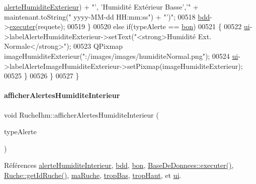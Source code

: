 \begin{DoxyCode}
      \hyperlink{parametres_8h_a83a725fd153179a2bd97afcc8307737bacda66fabe33c8c197f8ff098a952fca3}{alerteHumiditeExterieur}) + \textcolor{stringliteral}{"', 'Humidité Extérieur Basse','"} + maintenant.toString(\textcolor{stringliteral}{"
      yyyy-MM-dd  HH:mm:ss"}) + \textcolor{stringliteral}{"')"};
00518             \hyperlink{class_ruche_ihm_a0851936fe212e8d40538264f09749153}{bdd}->\hyperlink{class_base_de_donnees_aa8de5f8f8bb17edc43f5c0ee33712081}{executer}(requete);
00519          \}
00520          \textcolor{keywordflow}{else} \textcolor{keywordflow}{if}(typeAlerte == \hyperlink{parametres_8h_aaa6de8207c94675264c90b10b613368da5ac8ec3b54d90a07c6bb5a77ef971821}{bon})
00521          \{
00522             \hyperlink{class_ruche_ihm_a64786058bd7f88ca2f1e9743bb27c25b}{ui}->labelAlerteHumiditeExterieur->setText(\textcolor{stringliteral}{"<strong>Humidité Ext. Normale</strong>"});
00523             QPixmap imageHumiditeExterieur(\textcolor{stringliteral}{":/images/images/humiditeNormal.png"});
00524             \hyperlink{class_ruche_ihm_a64786058bd7f88ca2f1e9743bb27c25b}{ui}->labelAlerteImageHumiditeExterieur->setPixmap(imageHumiditeExterieur);
00525          \}
00526     \}
00527 \}
\end{DoxyCode}
\mbox{\label{class_ruche_ihm_abfe91b271dde97048bb218b04c9e167b}} 
\paragraph{\texorpdfstring{afficher\+Alertes\+Humidite\+Interieur}{afficherAlertesHumiditeInterieur}}
{\footnotesize\ttfamily void Ruche\+Ihm\+::afficher\+Alertes\+Humidite\+Interieur (\begin{DoxyParamCaption}\item[{\hyperlink{parametres_8h_aaa6de8207c94675264c90b10b613368d}{Seuils\+Alertes}}]{type\+Alerte }\end{DoxyParamCaption})\hspace{0.3cm}{\ttfamily [slot]}}



Références \hyperlink{parametres_8h_a83a725fd153179a2bd97afcc8307737bac0e80b2d9b7f04033abc44ebcf61883a}{alerte\+Humidite\+Interieur}, \hyperlink{class_ruche_ihm_a0851936fe212e8d40538264f09749153}{bdd}, \hyperlink{parametres_8h_aaa6de8207c94675264c90b10b613368da5ac8ec3b54d90a07c6bb5a77ef971821}{bon}, \hyperlink{class_base_de_donnees_aa8de5f8f8bb17edc43f5c0ee33712081}{Base\+De\+Donnees\+::executer()}, \hyperlink{class_ruche_a9f2de5ef29557ec7a53d5e22df34d164}{Ruche\+::get\+Id\+Ruche()}, \hyperlink{class_ruche_ihm_a43a6b1fa31f4fba58d919daae3707b38}{ma\+Ruche}, \hyperlink{parametres_8h_aaa6de8207c94675264c90b10b613368da4257e2f8921856770c8266f55c937295}{trop\+Bas}, \hyperlink{parametres_8h_aaa6de8207c94675264c90b10b613368dabc650d9700ae19f2696e6a6e3f9ab067}{trop\+Haut}, et \hyperlink{class_ruche_ihm_a64786058bd7f88ca2f1e9743bb27c25b}{ui}.



